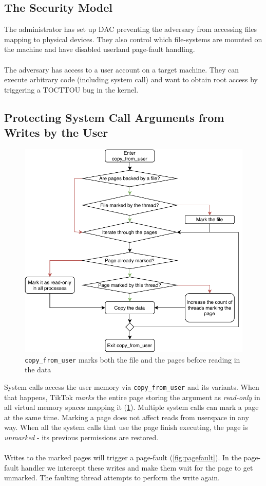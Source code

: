 \subsection{The Security Model}
\label{subsec:secmodel}
The administrator has set up DAC preventing the adversary from accessing files mapping to physical devices.
They also control which file-systems are mounted on the machine and have disabled userland page-fault handling.
\\
\\
The adversary has access to a user account on a target machine. They can execute arbitrary code (including system call)
and want to obtain root access by triggering a TOCTTOU bug in the kernel.

\subsection{Protecting System Call Arguments from Writes by the User}
\label{subsec:userland}
\begin{figure}[]
  \centering
  \includegraphics[width = .45 \textwidth]{img/copy_from_user.pdf}
  \caption{\texttt{copy\_from\_user} marks both the file and the pages before reading in the data}
  \label{fig:copyfromuser}
\end{figure}

System calls access the user memory via \texttt{copy\_from\_user} and its variants. When that happens, 
TikTok \emph{marks} the entire page storing the argument as \emph{read-only} in all virtual memory spaces 
mapping it (\cref{fig:copyfromuser}). Multiple system calls can mark a page at the same time. Marking a page does not affect reads
from userspace in any way. When all the system calls that use the page finish executing, the page is \emph{unmarked} - its
previous permissions are restored.
\\
\\
Writes to the marked pages will trigger a page-fault (\cref{fig:pagefault}). In the page-fault handler we intercept these writes 
and make them wait for the page to get unmarked. The faulting thread attempts to perform the
write again.

